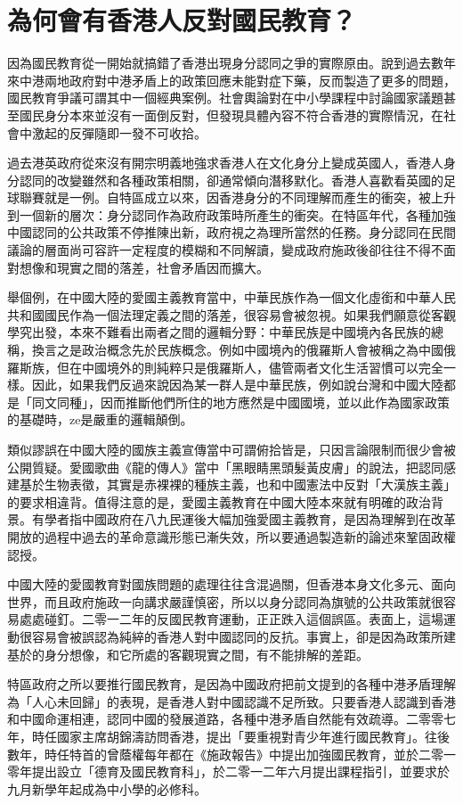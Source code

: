\section{為何會有香港人反對國民教育？}

因為國民教育從一開始就搞錯了香港出現身分認同之爭的實際原由。說到過去數年來中港兩地政府對中港矛盾上的政策回應未能對症下藥，反而製造了更多的問題，國民教育爭議可謂其中一個經典案例。社會輿論對在中小學課程中討論國家議題甚至國民身分本來並沒有一面倒反對，但發現具體內容不符合香港的實際情況，在社會中激起的反彈隨即一發不可收拾。

過去港英政府從來沒有開宗明義地強求香港人在文化身分上變成英國人，香港人身分認同的改變雖然和各種政策相關，卻通常傾向潛移默化。香港人喜歡看英國的足球聯賽就是一例。自特區成立以來，因香港身分的不同理解而產生的衝突，被上升到一個新的層次：身分認同作為政府政策時所產生的衝突。在特區年代，各種加強中國認同的公共政策不停推陳出新，政府視之為理所當然的任務。身分認同在民間議論的層面尚可容許一定程度的模糊和不同解讀，變成政府施政後卻往往不得不面對想像和現實之間的落差，社會矛盾因而擴大。

舉個例，在中國大陸的愛國主義教育當中，中華民族作為一個文化虛銜和中華人民共和國國民作為一個法理定義之間的落差，很容易會被忽視。如果我們願意從客觀學究出發，本來不難看出兩者之間的邏輯分野：中華民族是中國境內各民族的總稱，換言之是政治概念先於民族概念。例如中國境內的俄羅斯人會被稱之為中國俄羅斯族，但在中國境外的則純粹只是俄羅斯人，儘管兩者文化生活習慣可以完全一樣。因此，如果我們反過來說因為某一群人是中華民族，例如說台灣和中國大陸都是「同文同種」，因而推斷他們所住的地方應然是中國國境，並以此作為國家政策的基礎時，ze是嚴重的邏輯顛倒。

類似謬誤在中國大陸的國族主義宣傳當中可謂俯拾皆是，只因言論限制而很少會被公開質疑。愛國歌曲《龍的傳人》當中「黑眼睛黑頭髮黃皮膚」的說法，把認同感建基於生物表徵，其實是赤裸裸的種族主義，也和中國憲法中反對「大漢族主義」的要求相違背。值得注意的是，愛國主義教育在中國大陸本來就有明確的政治背景。有學者指中國政府在八九民運後大幅加強愛國主義教育，是因為理解到在改革開放的過程中過去的革命意識形態已漸失效，所以要通過製造新的論述來鞏固政權認授。

中國大陸的愛國教育對國族問題的處理往往含混過關，但香港本身文化多元、面向世界，而且政府施政一向講求嚴謹慎密，所以以身分認同為旗號的公共政策就很容易處處碰釘。二零一二年的反國民教育運動，正正跌入這個誤區。表面上，這場運動很容易會被誤認為純綷的香港人對中國認同的反抗。事實上，卻是因為政策所建基於的身分想像，和它所處的客觀現實之間，有不能排解的差距。

特區政府之所以要推行國民教育，是因為中國政府把前文提到的各種中港矛盾理解為「人心未回歸」的表現，是香港人對中國認識不足所致。只要香港人認識到香港和中國命運相連，認同中國的發展道路，各種中港矛盾自然能有效疏導。二零零七年，時任國家主席胡錦濤訪問香港，提出「要重視對青少年進行國民教育」。往後數年，時任特首的曾蔭權每年都在《施政報告》中提出加強國民教育，並於二零一零年提出設立「德育及國民教育科」，於二零一二年六月提出課程指引，並要求於九月新學年起成為中小學的必修科。

